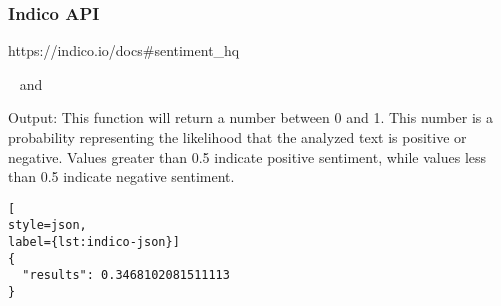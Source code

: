\subsubsection*{Indico API}
\begin{description}
\singlespacing
 \item[Web url:] https://indico.io/docs\#sentiment\_hq
 \item[Database columns:]  and 
\end{description}
Output: 
This function will return a number between 0 and 1. This number is a probability representing the likelihood that the analyzed text is positive or negative. Values greater than 0.5 indicate positive sentiment, while values less than 0.5 indicate negative sentiment.
\begin{lstlisting}[
style=json,
label={lst:indico-json}]
{
  "results": 0.3468102081511113
}
\end{lstlisting}
